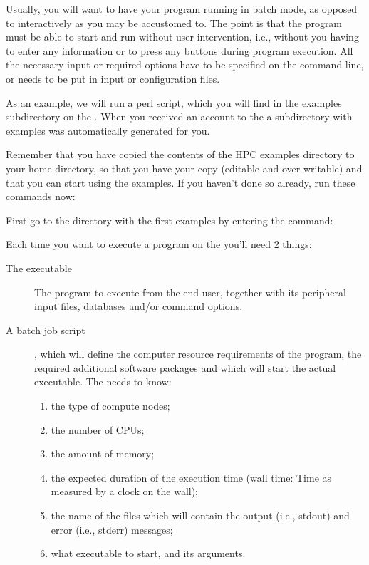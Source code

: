 Usually, you will want to have your program running in batch mode, as opposed
to interactively as you may be accustomed to. The point is that the program
must be able to start and run without user intervention, i.e., without you
having to enter any information or to press any buttons during program
execution. All the necessary input or required options have to be specified on
the command line, or needs to be put in input or configuration files.

As an example, we will run a perl script, which you will find in the examples
subdirectory on the \hpc. When you received an account to the \hpc a
subdirectory with examples was automatically generated for you.

Remember that you have copied the contents of the HPC examples directory to
your home directory, so that you have your  copy (editable
and over-writable) and that you can start using the examples. If you haven't
done so already, run these commands now:

\begin{prompt}
\end{prompt}

First go to the directory with the first examples by entering the command:

\begin{prompt}
\end{prompt}

Each time you want to execute a program on the \hpc you'll need 2 things:

\begin{description}
  \item[The executable] The program to execute from the end-user, together with its peripheral input files, databases and/or command options.
  \item[A batch job script], which will define the computer resource requirements of the program, the required additional software packages and which will start the actual executable.  The \hpc needs to know:
    \begin{enumerate}
      \item  the type of compute nodes;
      \item  the number of CPUs;
      \item  the amount of memory;
      \item  the expected duration of the execution time (wall time: Time as measured by a clock on the wall);
      \item  the name of the files which will contain the output (i.e., stdout) and error (i.e., stderr) messages;
      \item  what executable to start, and its arguments.
    \end{enumerate}
\end{description}

